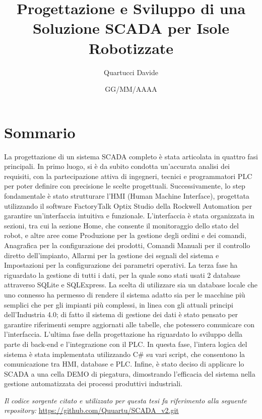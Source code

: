 \documentclass[12pt,a4paper,twoside,openright]{extreport}
\title{Progettazione e Sviluppo di una Soluzione SCADA per Isole Robotizzate}
\author{Quartucci Davide}
\date{GG/MM/AAAA}
\begin{document}
    \pagestyle{empty}                           %

    
    \cleardoublepage
    
    
    \cleardoublepage

    \pagestyle{plain}                           %

    \chapter*{Sommario}
    La progettazione di un sistema SCADA completo è stata articolata in quattro fasi principali. In primo luogo, si è da subito condotta un'accurata analisi dei requisiti, con la partecipazione attiva di ingegneri, tecnici e programmatori PLC per poter definire con precisione le scelte progettuali. Successivamente, lo step fondamentale è stato strutturare l’HMI (Human Machine Interface), progettata utilizzando il software FactoryTalk Optix Studio della Rockwell Automation per garantire un'interfaccia intuitiva e funzionale. L'interfaccia è stata organizzata in sezioni, tra cui la sezione Home, che consente il monitoraggio dello stato del robot, e altre aree come Produzione per la gestione degli ordini e dei comandi, Anagrafica per la configurazione dei prodotti, Comandi Manuali per il controllo diretto dell'impianto, Allarmi per la gestione dei segnali del sistema e Impostazioni per la configurazione dei parametri operativi. La terza fase ha riguardato la gestione di tutti i dati, per la quale sono stati usati 2 database attraverso SQLite e SQLExpress. La scelta di utilizzare sia un database locale che uno connesso ha permesso di rendere il sistema adatto sia per le macchine più semplici che per gli impianti più complessi, in linea con gli attuali principi dell'Industria 4.0; di fatto il sistema di gestione dei dati è stato pensato per garantire riferimenti sempre aggiornati alle tabelle, che potessero comunicare con l'interfaccia. L'ultima fase della progettazione ha riguardato lo sviluppo della parte di back-end e l'integrazione con il PLC. In questa fase, l'intera logica del sistema è stata implementata utilizzando C\# su vari script, che consentono la comunicazione tra HMI, database e PLC. Infine, è stato deciso di applicare lo SCADA a una cella DEMO di piegatura, dimostrando l'efficacia del sistema nella gestione automatizzata dei processi produttivi industriali. 
    \begin{flushright}
        \textit{Il codice sorgente citato e utilizzato per questa tesi fa riferimento alla seguente repository:} \url{https://github.com/Quuartu/SCADA_v2.git}    
    \end{flushright}
    
\end{document}
